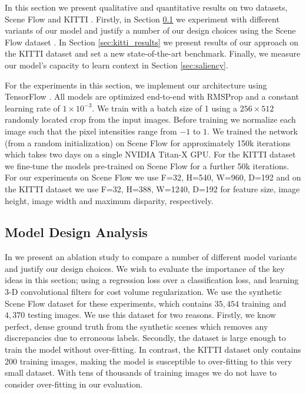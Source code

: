 In this section we present qualitative and quantitative results on two datasets, Scene Flow \citep{MIFDB16} and KITTI \citep{Geiger2012CVPR,Menze2015CVPR}. Firstly, in Section \ref{sec:model_results} we experiment with different variants of our model and justify a number of our design choices using the Scene Flow dataset \citep{MIFDB16}. In Section \ref{sec:kitti_results} we present results of our approach on the KITTI dataset and set a new state-of-the-art benchmark. Finally, we measure our model's capacity to learn context in Section \ref{sec:saliency}.

For the experiments in this section, we implement our architecture using TensorFlow \citep{abadi2016tensorflow}. All models are optimized end-to-end with RMSProp \citep{tieleman2012lecture} and a constant learning rate of $1 \times 10^{-3}$. We train with a batch size of 1 using a $256\times512$ randomly located crop from the input images. Before training we normalize each image such that the pixel intensities range from $-1$ to $1$. We trained the network (from a random initialization) on Scene Flow for approximately 150k iterations which takes two days on a single NVIDIA Titan-X GPU. For the KITTI dataset we fine-tune the models pre-trained on Scene Flow for a further 50k iterations. For our experiments on Scene Flow we use F=32, H=540, W=960, D=192 and on the KITTI dataset we use F=32, H=388, W=1240, D=192 for feature size, image height, image width and maximum disparity, respectively.

\subsection{Model Design Analysis}
\label{sec:model_results}

In  we present an ablation study to compare a number of different model variants and justify our design choices. We wish to evaluate the importance of the key ideas in this section; using a regression loss over a classification loss, and learning 3-D convolutional filters for cost volume regularization. We use the synthetic Scene Flow dataset \citep{MIFDB16} for these experiments, which contains $35,454$ training and $4,370$ testing images. We use this dataset for two reasons. Firstly, we know perfect, dense ground truth from the synthetic scenes which removes any discrepancies due to erroneous labels. Secondly, the dataset is large enough to train the model without over-fitting. In contrast, the KITTI dataset only contains 200 training images, making the model is susceptible to over-fitting to this very small dataset. With tens of thousands of training images we do not have to consider over-fitting in our evaluation.

